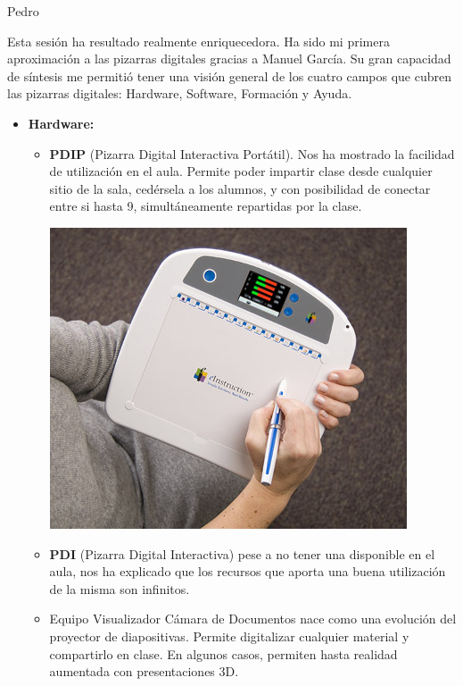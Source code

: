 \begin{opin}{\pedrocolor}{Pedro}


Esta sesión ha resultado realmente enriquecedora. Ha sido mi primera aproximación a las pizarras digitales gracias a Manuel García. Su gran capacidad de síntesis me permitió tener una visión general de los cuatro campos que cubren las pizarras digitales: Hardware, Software, Formación y Ayuda.

\begin{itemize}

\item \textbf{Hardware:}
\begin{itemize}

\item \textbf{PDIP} (Pizarra Digital Interactiva Portátil). Nos ha mostrado la facilidad de utilización en el aula. Permite poder impartir clase desde cualquier sitio de la sala, cedérsela a los alumnos, y con posibilidad de conectar entre si hasta 9,  simultáneamente repartidas por la clase. 

\begin{minipage}[hbtp]{1.0\linewidth}
\centering
\includegraphics[scale=0.4]{img/pdipedro.jpg}
\end{minipage}

 
\item \textbf{PDI} (Pizarra Digital Interactiva) pese a no tener una disponible en el aula, nos ha explicado que los recursos que aporta una buena utilización de la misma son infinitos. 

\item Equipo Visualizador Cámara de Documentos nace como una evolución del proyector de diapositivas. Permite digitalizar cualquier material y compartirlo en clase. En algunos casos, permiten hasta realidad aumentada con presentaciones 3D. 


\end{itemize}
\end{itemize}
\end{opin}
